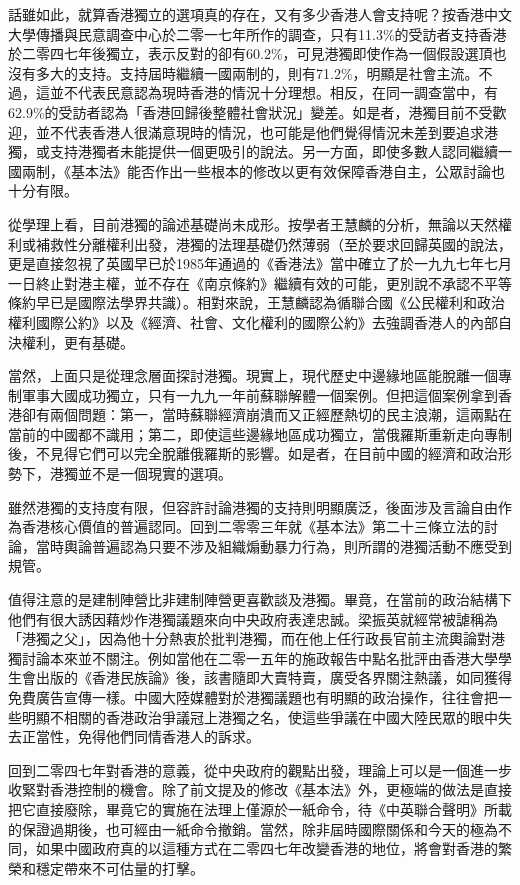 話雖如此，就算香港獨立的選項真的存在，又有多少香港人會支持呢？按香港中文大學傳播與民意調查中心於二零一七年所作的調查，只有11.3\%的受訪者支持香港於二零四七年後獨立，表示反對的卻有60.2\%，可見港獨即使作為一個假設選頂也沒有多大的支持。支持屆時繼續一國兩制的，則有71.2\%，明顯是社會主流。不過，這並不代表民意認為現時香港的情況十分理想。相反，在同一調查當中，有62.9\%的受訪者認為「香港回歸後整體社會狀況」變差。如是者，港獨目前不受歡迎，並不代表香港人很滿意現時的情況，也可能是他們覺得情況未差到要追求港獨，或支持港獨者未能提供一個更吸引的說法。另一方面，即使多數人認同繼續一國兩制，《基本法》能否作出一些根本的修改以更有效保障香港自主，公眾討論也十分有限。

從學理上看，目前港獨的論述基礎尚未成形。按學者王慧麟的分析，無論以天然權利或補救性分離權利出發，港獨的法理基礎仍然薄弱（至於要求回歸英國的說法，更是直接忽視了英國早已於1985年通過的《香港法》當中確立了於一九九七年七月一日終止對港主權，並不存在《南京條約》繼續有效的可能，更別說不承認不平等條約早已是國際法學界共識）。相對來說，王慧麟認為循聯合國《公民權利和政治權利國際公約》以及《經濟、社會、文化權利的國際公約》去強調香港人的內部自決權利，更有基礎。

當然，上面只是從理念層面探討港獨。現實上，現代歷史中邊緣地區能脫離一個專制軍事大國成功獨立，只有一九九一年前蘇聯解體一個案例。但把這個案例拿到香港卻有兩個問題：第一，當時蘇聯經濟崩潰而又正經歷熱切的民主浪潮，這兩點在當前的中國都不識用；第二，即使這些邊緣地區成功獨立，當俄羅斯重新走向專制後，不見得它們可以完全脫離俄羅斯的影響。如是者，在目前中國的經濟和政治形勢下，港獨並不是一個現實的選項。

雖然港獨的支持度有限，但容許討論港獨的支持則明顯廣泛，後面涉及言論自由作為香港核心價值的普遍認同。回到二零零三年就《基本法》第二十三條立法的討論，當時輿論普遍認為只要不涉及組織煽動暴力行為，則所謂的港獨活動不應受到規管。

值得注意的是建制陣營比非建制陣營更喜歡談及港獨。畢竟，在當前的政治結構下他們有很大誘因藉炒作港獨議題來向中央政府表達忠誠。梁振英就經常被謔稱為「港獨之父」，因為他十分熱衷於批判港獨，而在他上任行政長官前主流輿論對港獨討論本來並不關注。例如當他在二零一五年的施政報告中點名批評由香港大學學生會出版的《香港民族論》後，該書隨即大賣特賣，廣受各界關注熱議，如同獲得免費廣告宣傳一樣。中國大陸媒體對於港獨議題也有明顯的政治操作，往往會把一些明顯不相關的香港政治爭議冠上港獨之名，使這些爭議在中國大陸民眾的眼中失去正當性，免得他們同情香港人的訴求。

回到二零四七年對香港的意義，從中央政府的觀點出發，理論上可以是一個進一步收緊對香港控制的機會。除了前文提及的修改《基本法》外，更極端的做法是直接把它直接廢除，畢竟它的實施在法理上僅源於一紙命令，待《中英聯合聲明》所載的保證過期後，也可經由一紙命令撤銷。當然，除非屆時國際關係和今天的極為不同，如果中國政府真的以這種方式在二零四七年改變香港的地位，將會對香港的繁榮和穩定帶來不可估量的打擊。

